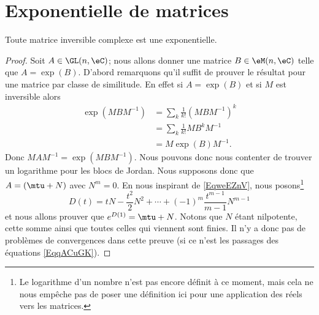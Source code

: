 \section{Exponentielle de matrices}

\begin{proposition} \label{PropKKdmnkD}
    Toute matrice inversible complexe est une exponentielle.
\end{proposition}

\begin{proof}
    Soit \( A\in \GL(n,\eC)\); nous allons donner une matrice \( B\in \eM(n,\eC)\) telle que \( A=\exp(B)\). D'abord remarquons qu'il suffit de prouver le résultat pour une matrice par classe de similitude. En effet si \( A=\exp(B)\) et si \( M\) est inversible alors
    \begin{subequations}    \label{EqqACuGK}
        \begin{align}
            \exp(MBM^{-1})&=\sum_k\frac{1}{ k! }(MBM^{-1})^k\\
            &=\sum_k\frac{1}{ k! }MB^kM^{-1}\\
            &=M\exp(B)M^{-1}.
        \end{align}
    \end{subequations}
    Donc \( MAM^{-1}=\exp(MBM^{-1})\). Nous pouvons donc nous contenter de trouver un logarithme pour les blocs de Jordan. Nous supposons donc que \( A=(\mtu+N)\) avec \( N^m=0\).
    En nous inspirant de \eqref{EqweEZnV}, nous posons\footnote{Le logarithme d'un nombre n'est pas encore définit à ce moment, mais cela ne nous empêche pas de poser une définition ici pour une application des réels vers les matrices.}
    \begin{equation}
        D(t)=tN-\frac{ t^2 }{ 2 }N^2+\cdots +(-1)^m\frac{ t^{m-1} }{ m-1 }N^{m-1}
    \end{equation}
    et nous allons prouver que \(  e^{D(1)}=\mtu+N\). Notons que \( N\) étant nilpotente, cette somme ainsi que toutes celles qui viennent sont finies. Il n'y a donc pas de problèmes de convergences dans cette preuve (si ce n'est les passages des équations \eqref{EqqACuGK}).


\end{proof}
